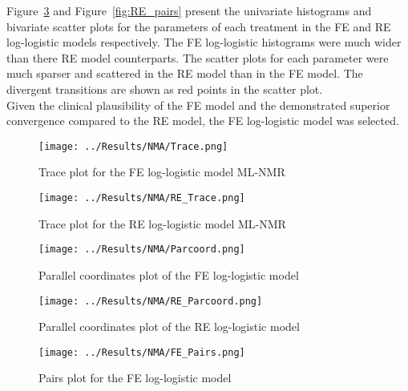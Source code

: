 Figure~\ref{fig:pairs} and Figure~\ref{fig:RE_pairs} present the univariate histograms and bivariate scatter plots for the parameters of each treatment in the FE and RE log-logistic models respectively. The FE log-logistic histograms were much wider than there RE model counterparts. The scatter plots for each parameter were much sparser and scattered in the RE model than in the FE model. The divergent transitions are shown as red points in the scatter plot. \\

Given the clinical plausibility of the FE model and the demonstrated superior convergence compared to the RE model, the FE log-logistic model was selected.

\begin{figure}[h]
    \centering
    \begin{minipage}[b]{0.45\textwidth}
        \centering
        \texttt{[image: ../Results/NMA/Trace.png]}
        \caption{Trace plot for the FE log-logistic model ML-NMR}
        \label{fig:tracebcFE}
    \end{minipage}
    \hspace{0.05\textwidth}
    \begin{minipage}[b]{0.45\textwidth}
        \centering
        \texttt{[image: ../Results/NMA/RE\_Trace.png]}
        \caption{Trace plot for the RE log-logistic model ML-NMR}
        \label{fig:tracebcRE}
    \end{minipage}
\end{figure}

\begin{figure}[h]
    \centering
    \begin{minipage}[b]{0.45\textwidth}
        \centering
        \texttt{[image: ../Results/NMA/Parcoord.png]}
        \caption{Parallel coordinates plot of the FE log-logistic model}
        \label{fig:parcoord}
    \end{minipage}
    \hspace{0.05\textwidth}
    \begin{minipage}[b]{0.45\textwidth}
        \centering
        \texttt{[image: ../Results/NMA/RE\_Parcoord.png]}
        \caption{Parallel coordinates plot of the RE log-logistic model}
        \label{fig:RE_parcoord}
    \end{minipage}
\end{figure}

\begin{figure}[h]
    \centering
    \texttt{[image: ../Results/NMA/FE\_Pairs.png]}
    \caption{Pairs plot for the FE log-logistic model}
    \label{fig:pairs}
\end{figure}

